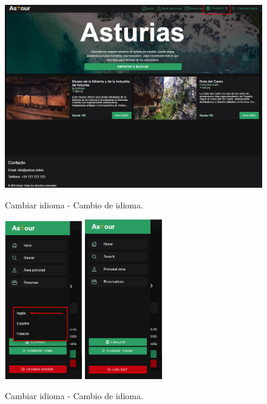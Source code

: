 \begin{figure}[H]
	\centering
	\begin{minipage}{0.45\textwidth}
		\centering
		\includegraphics[width=1\textwidth]{7-Construccion/Manuales/web/idioma.png}
		\caption{Cambiar idioma - Cambio de idioma.}
		\label{fig:idioma-web}
	\end{minipage}
	\begin{minipage}{0.45\textwidth}
		\centering
		\includegraphics[width=0.3\textwidth]{7-Construccion/Manuales/mobile/opciones idioma.png}
		\includegraphics[width=0.3\textwidth]{7-Construccion/Manuales/mobile/ingles.png}
		\caption{Cambiar idioma - Cambio de idioma.}
		\label{fig:cambio-idioma}
	\end{minipage}
\end{figure}

